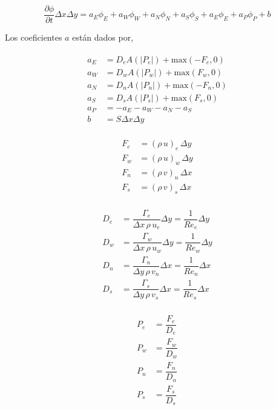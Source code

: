 \begin{equation} \label{ecuacion_patankar}
\dfrac{\partial \phi}{\partial t} \Delta x \Delta y = a_E \phi_E + a_W \phi_W + a_N \phi_N + a_S \phi_S + a_E \phi_E + a_P \phi_P + b
\end{equation} 

Los coeficientes $a$ están dados por,

\begin{align} \label{coeficientes_patankar}
\begin{split}
a_E &= D_e A(|P_e|) + \mbox{max}(-F_e,0) \\
a_W &= D_w A(|P_w|) + \mbox{max}(F_w,0) \\
a_N &= D_n A(|P_n|) + \mbox{max}(-F_n,0) \\
a_S &= D_s A(|P_s|) + \mbox{max}(F_s,0) \\
a_P &= -a_E -a_W -a_N -a_S \\
b &= S \Delta x \Delta y
\end{split}
\end{align}

\begin{align}
\begin{split}
F_e &= (\rho \, u)_e \, \Delta y \\
F_w &= (\rho \, u)_w \, \Delta y \\
F_n &= (\rho \, v)_n \, \Delta x \\
F_s &= (\rho \, v)_s \, \Delta x
\end{split}
\end{align}

\begin{align}
\begin{split}
D_e &= \dfrac{\Gamma_e}{\Delta x \, \rho \, u_e} \Delta y = \dfrac{1}{Re_e} \Delta y \\
D_w &= \dfrac{\Gamma_w}{\Delta x \, \rho \, u_w} \Delta y = \dfrac{1}{Re_w} \Delta y \\
D_n &= \dfrac{\Gamma_n}{\Delta y \, \rho \, v_n} \Delta x = \dfrac{1}{Re_n} \Delta x \\
D_s &= \dfrac{\Gamma_s}{\Delta y \, \rho \, v_s} \Delta x = \dfrac{1}{Re_s} \Delta x
\end{split}
\end{align}

\begin{align}
\begin{split}
P_e &= \dfrac{F_e}{D_e} \\
P_w &= \dfrac{F_w}{D_w} \\
P_n &= \dfrac{F_n}{D_n} \\
P_s &= \dfrac{F_s}{D_s}
\end{split}
\end{align}

